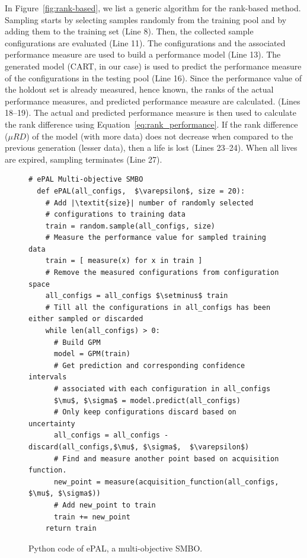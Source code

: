 \documentclass[10pt,journal,compsoc]{IEEEtran}
\begin{document}
In Figure~\ref{fig:rank-based}, we list a generic algorithm for the rank-based method. Sampling starts by selecting samples randomly from the training pool and by adding them to the training set (Line 8). Then, the collected sample configurations are evaluated (Line 11). The configurations and the associated performance measure are used to build a performance model (Line 13). The generated model (CART, in our case) is used to predict the performance measure of the configurations in the testing pool (Line 16). Since the performance value of the holdout set is already measured, hence known, the ranks of the actual performance measures, and predicted performance measure are calculated. (Lines 18--19). The actual and predicted performance measure is then used to calculate the rank difference using Equation~\ref{eq:rank_performance}. If the rank difference ($\mu RD$) of the model (with more data) does not decrease when compared to the previous generation (lesser data), then a life is lost (Lines 23--24). When all lives are expired, sampling terminates (Line 27).
\begin{figure}[!t]
\hspace{0.4cm}\begin{lstlisting}[xrightmargin=5.0ex,mathescape,frame=none,numbers=right]
  # ePAL Multi-objective SMBO
  def ePAL(all_configs,  $\varepsilon$, size = 20):  
    # Add |\textit{size}| number of randomly selected 
    # configurations to training data
    train = random.sample(all_configs, size)
    # Measure the performance value for sampled training data
    train = [ measure(x) for x in train ]
    # Remove the measured configurations from configuration space
    all_configs = all_configs $\setminus$ train  
    # Till all the configurations in all_configs has been either sampled or discarded 
    while len(all_configs) > 0:
      # Build GPM
      model = GPM(train)
      # Get prediction and corresponding confidence intervals
      # associated with each configuration in all_configs
      $\mu$, $\sigma$ = model.predict(all_configs)
      # Only keep configurations discard based on uncertainty 
      all_configs = all_configs - discard(all_configs,$\mu$, $\sigma$,  $\varepsilon$)
      # Find and measure another point based on acquisition function.
      new_point = measure(acquisition_function(all_configs, $\mu$, $\sigma$))
      # Add new_point to train 
      train += new_point
    return train 
\end{lstlisting}
\caption{\small{Python code of ePAL, a multi-objective SMBO.}}
\label{fig:ePAL}  
\end{figure}
\end{document}
